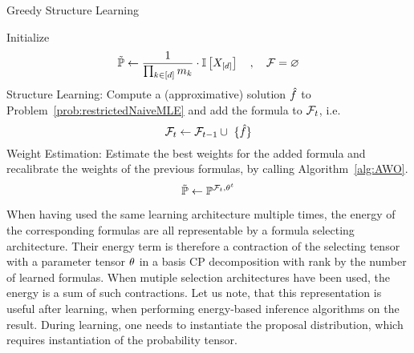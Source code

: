 \begin{algorithm}[hbt!]
\caption{Greedy Structure Learning}\label{alg:greedyStructureLearning}
\begin{algorithmic}
	\State Initialize
		\[ \tilde{\mathbb{P}} \leftarrow \frac{1}{\prod_{k\in[d]}m_{k}} \cdot \mathbb{I}\left[X_{[d]}\right] \quad, \quad \mathcal{F} = \varnothing \]
		\State Structure Learning: Compute a (approximative) solution $\hat{f}$ to Problem~\ref{prob:restrictedNaiveMLE} and add the formula to $\mathcal{F}_{t}$, i.e.
				\[ \formulasetof{t} \algdefsymbol \formulasetof{t-1} \cup \{\hat{\formula}\} \]
		\State Weight Estimation: Estimate the best weights for the added formula and recalibrate the weights of the previous formulas, by calling Algorithm~\ref{alg:AWO}.
			\[ \tilde{\mathbb{P}} \leftarrow \mathbb{P}^{\mathcal{F}_{t}, \theta^{t}} \]
\EndWhile
\end{algorithmic}
\end{algorithm}



When having used the same learning architecture multiple times, the energy of the corresponding formulas are all representable by a formula selecting architecture.
Their energy term is therefore a contraction of the selecting tensor with a parameter tensor $\theta$ in a basis CP decomposition with rank by the number of learned formulas.
When mutiple selection architectures have been used, the energy is a sum of such contractions.
% 
Let us note, that this representation is useful after learning, when performing energy-based inference algorithms on the result.
During learning, one needs to instantiate the proposal distribution, which requires instantiation of the probability tensor.






